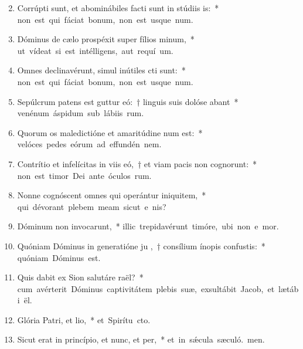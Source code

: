 \begin{flushleft}
\begin{enumerate}[leftmargin=*]
\setcounter{enumi}{1}


\item Corrúpti sunt, et abominábiles facti sunt in stúdiis is:~* \mbox{non est qui fáciat bonum, non est usque  num.}
\item Dóminus de cælo prospéxit super fílios minum,~* \mbox{ut vídeat si est intélligens, aut requí um.}
\item Omnes declinavérunt, simul inútiles cti sunt:~* \mbox{non est qui fáciat bonum, non est usque  num.}
\item Sepúlcrum patens est guttur eó:~† linguis suis dolóse abant~* \mbox{venénum áspidum sub lábiis rum.}
\item Quorum os maledictióne et amaritúdine num est:~* \mbox{velóces pedes eórum ad effundén nem.}
\item Contrítio et infelícitas in viis eó,~† et viam pacis non cognorunt:~* \mbox{non est timor Dei ante óculos rum.}
\item Nonne cognóscent omnes qui operántur iniquitem,~* \mbox{qui dévorant plebem meam sicut e nis?}
\item Dóminum non invocarunt,~* \mbox{illic trepidavérunt timóre, ubi non e mor.}
\item Quóniam Dóminus in generatióne ju ,~† consílium ínopis confustis:~* \mbox{quóniam Dóminus   est.}
\item \sloppy Quis dabit ex Sion salutáre raël?~* \mbox{cum avérterit Dóminus captivitátem plebis suæ, exsultábit Jacob, et lætábi ël.}
\item Glória Patri, et lio,~* \mbox{et Spirítu cto.}
\item Sicut erat in princípio, et nunc, et per,~* \mbox{et in s\'{\ae}cula sæculó. men.}


\end{enumerate}
\end{flushleft}

